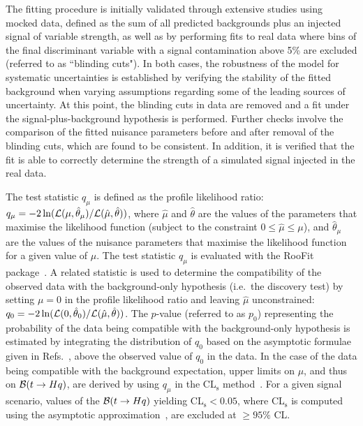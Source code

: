 The fitting procedure is initially validated through extensive studies using mocked data, defined as the sum of all predicted backgrounds 
plus an injected signal of variable strength, as well as by performing fits to real data where bins of the final discriminant variable with 
a signal contamination above 5\% are excluded (referred to as ``blinding cuts").
In both cases, the robustness of the model for systematic uncertainties is established by verifying the stability of the fitted background 
when varying assumptions regarding some of the leading sources of uncertainty. At this point, the blinding cuts in data 
are removed and a fit under the signal-plus-background hypothesis is performed. Further checks involve the comparison of the fitted 
nuisance parameters before and after removal of the blinding cuts, which are found to be consistent. In addition, it is verified that the 
fit is able to correctly determine the strength of a simulated signal injected in the real data.

The test statistic $q_\mu$ is defined as the profile likelihood ratio: 
$q_\mu = -2\ln({\cal L}(\mu,{\hat{\theta}}_\mu)/{\cal L}(\hat{\mu},\hat{\theta}))$,
where $\hat{\mu}$ and $\hat{\theta}$ are the values of the parameters that
maximise the likelihood function (subject to the constraint $0\leq \hat{\mu} \leq \mu$), and ${\hat{\theta}}_\mu$ are the values of the
nuisance parameters that maximise the likelihood function for a given value of $\mu$. 
The test statistic $q_\mu$ is evaluated with the {\textsc RooFit} package~\cite{Verkerke:2003ir,RooFitManual}.
A related statistic is used to determine the compatibility of the observed data with the background-only hypothesis (i.e.~the discovery test)  
by setting $\mu=0$ in the profile likelihood ratio and leaving $\hat{\mu}$ unconstrained: $q_0 = -2\ln({\cal L}(0,{\hat{\theta}}_0)/{\cal L}(\hat{\mu},\hat{\theta}))$.
The $p$-value (referred to as $p_0$) representing the probability of the data being compatible with the background-only hypothesis is estimated by integrating
the distribution of $q_0$ based on the asymptotic formulae given in Refs.~\cite{Cowan:2010js}, 
above the observed value of $q_0$ in the data. 
In the case of the data being compatible with the background expectation, upper limits on $\mu$, and thus on 
$\mathcal{B}(t\to Hq)$, are derived by using $q_\mu$ in the CL$_{\textrm{s}}$ method~\cite{Junk:1999kv,Read:2002hq}.
For a given signal scenario, values of the $\mathcal{B}(t\to Hq)$ yielding CL$_{\textrm{s}} < 0.05$, 
where CL$_{\textrm{s}}$ is computed using the asymptotic approximation~\cite{Cowan:2010js}, are excluded at $\geq 95\%$ CL.


